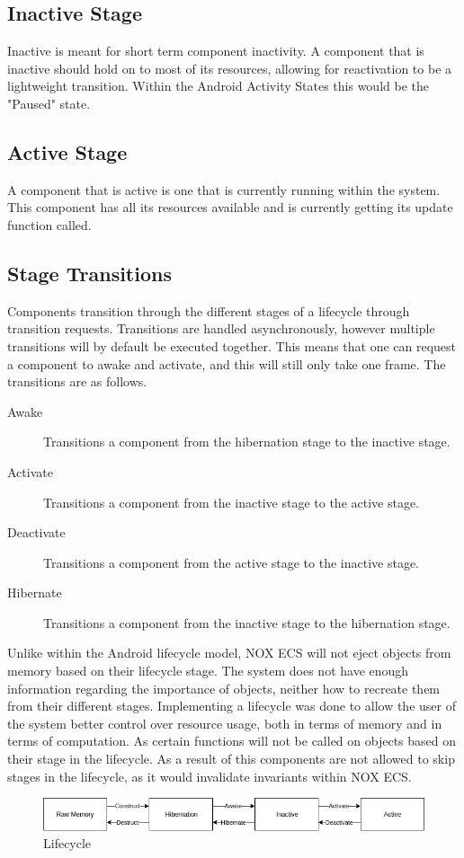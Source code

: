 \subsection{Inactive Stage}
Inactive is meant for short term component inactivity.
A component that is inactive should hold on to most of its resources, allowing for reactivation to be a lightweight transition.
Within the Android Activity States this would be the "Paused" state\cite[Activity state and ejection from memory]{android_activity_lifecycle}.

\subsection{Active Stage}
A component that is active is one that is currently running within the system.
This component has all its resources available and is currently getting its update function called.

\subsection{Stage Transitions}
Components transition through the different stages of a lifecycle through transition requests.
Transitions are handled asynchronously, however multiple transitions will by default be executed together.
This means that one can request a component to awake and activate, and this will still only take one frame.
The transitions are as follows.
\begin{description}
    \item
    [Awake] Transitions a component from the hibernation stage to the inactive stage.

    \item
    [Activate] Transitions a component from the inactive stage to the active stage.

    \item
    [Deactivate] Transitions a component from the active stage to the inactive stage.

    \item
    [Hibernate] Transitions a component from the inactive stage to the hibernation stage.
\end{description}

Unlike within the Android lifecycle model, NOX ECS will not eject objects from memory based on their lifecycle stage\cite[Activity state and ejection from memory]{android_activity_lifecycle}.
The system does not have enough information regarding the importance of objects, neither how to recreate them from their different stages.
Implementing a lifecycle was done to allow the user of the system better control over resource usage, both in terms of memory
and in terms of computation. As certain functions will not be called on objects based on their stage in the lifecycle.
As a result of this components are not allowed to skip stages in the lifecycle, as it would invalidate invariants within NOX ECS.

\begin{figure}[tbp]
    \begin{center}
    \includegraphics[scale=0.5]{images/lifecycle_horizontal.png}
    \caption{Lifecycle}
    \label{fig:lifecycle}
    \end{center}
\end{figure}
